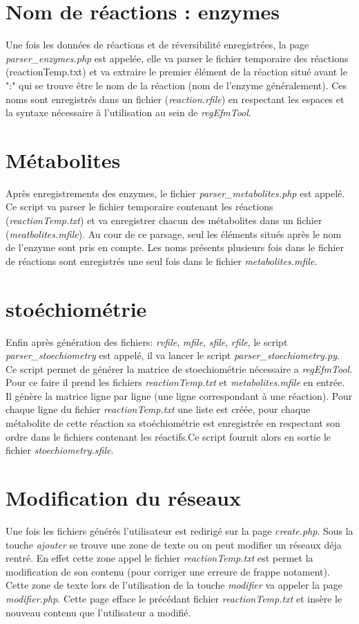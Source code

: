 \section{Nom de réactions : enzymes}
Une fois les données de réactions et de réversibilité enregistrées, la page \emph{parser\_enzymes.php} est appelée, elle va parser le fichier temporaire des réactions  (reactionTemp.txt) et va extraire le premier élément de la réaction situé avant le ":" qui se trouve être le nom de la réaction (nom de l'enzyme généralement).
Ces noms sont enregistrés dans un fichier (\emph{reaction.rfile}) en respectant les espaces et la syntaxe nécessaire à l'utilisation au sein de \emph{regEfmTool}.

\section{Métabolites}
Après enregistrements des enzymes, le fichier \emph{parser\_metabolites.php} est appelé. Ce script va parser le fichier temporaire contenant les réactions (\emph{reactionTemp.txt}) et va enregistrer chacun des métabolites dans un fichier (\emph{meatbolites.mfile}). Au cour de ce parsage, seul les éléments situés après le nom de l'enzyme sont pris en compte. Les noms présents plusieurs fois dans le fichier de réactions sont enregistrés une seul fois dans le fichier \emph{metabolites.mfile}.

\section{stoéchiométrie}
Enfin après génération des fichiers: \emph{rvfile}, \emph{mfile}, \emph{sfile}, \emph{rfile}, le script \emph{parser\_stoechiometry} est appelé, il va lancer le script \emph{parser\_stoechiometry.py}. Ce script permet de générer la matrice de stoechiométrie nécessaire a \emph{regEfmTool}. Pour ce faire il prend les fichiers \emph{reactionTemp.txt} et \emph{metabolites.mfile} en entrée. Il génère la matrice ligne par ligne (une ligne correspondant à une réaction). Pour chaque ligne du fichier \emph{reactionTemp.txt} une liste est créée, pour chaque métabolite de cette réaction sa stoéchiométrie est enregistrée en respectant son ordre dans le fichiers contenant les réactifs.Ce script fournit alors en sortie le fichier \emph{stoechiometry.sfile}.

\section{Modification du réseaux}
Une fois les fichiers générés l'utilisateur est redirigé sur la page \emph{create.php}.
Sous la touche \emph{ajouter} se trouve une zone de texte ou on peut modifier un réseaux déja rentré. En effet cette zone appel le fichier \emph{reactionTemp.txt} est permet la modification de son contenu (pour corriger une erreure de frappe notament). Cette zone de texte lors de l'utilisation de la touche \emph{modifier} va appeler la page \emph{modifier.php}. Cette page efface le précédant fichier \emph{reactionTemp.txt} et insère le nouveau contenu que l'utilisateur a modifié.

